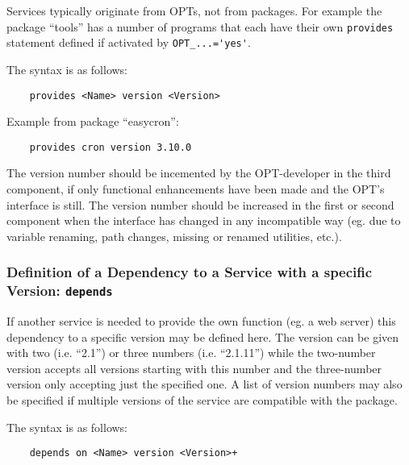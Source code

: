     Services typically originate from OPTs, not from packages. For example
    the package ``tools'' has a number of programs that each have their own
    \texttt{provides} statement defined if activated by \verb+OPT_...='yes'+.

    The syntax is as follows:

\begin{example}
\begin{verbatim}
    provides <Name> version <Version>
\end{verbatim}
\end{example}

    Example from package ``easycron'':

\begin{example}
\begin{verbatim}
    provides cron version 3.10.0
\end{verbatim}
\end{example}

    The version number should be incemented by the OPT-developer in the third
    component, if only functional enhancements have been made and the OPT's
    interface is still. The version number should be increased in the first or
    second component when the interface has changed in any incompatible way (eg.
    due to variable renaming, path changes, missing or renamed utilities, etc.).

\subsubsection{Definition of a Dependency to a Service with a
    specific Version: \texttt{depends}}

    If another service is needed to provide the own function (eg. a web server)
    this dependency to a specific version may be defined here. The version can
    be given with two (i.e. ``2.1'') or three numbers (i.e. ``2.1.11'')
    while the two-number version accepts all versions starting with this
    number and the three-number version only accepting just the specified one.
    A list of version numbers may also be specified if multiple versions of
    the service are compatible with the package.

    The syntax is as follows:

\begin{example}
\begin{verbatim}
    depends on <Name> version <Version>+
\end{verbatim}
\end{example}


